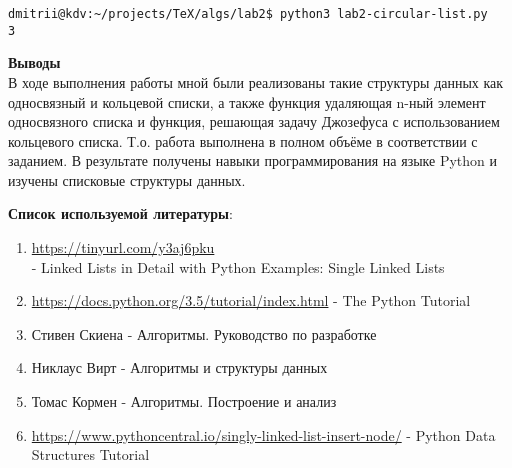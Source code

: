\documentclass[12pt]{article}
\begin{document}
\begin{verbatim}
dmitrii@kdv:~/projects/TeX/algs/lab2$ python3 lab2-circular-list.py 
3
\end{verbatim}
\textbf{Выводы}\\
В ходе выполнения работы мной были реализованы такие структуры данных как односвязный и кольцевой списки, а также функция удаляющая n-ный элемент односвязного списка и функция, решающая задачу Джозефуса с использованием кольцевого списка. Т.о. работа выполнена в полном объёме в соответствии с заданием. В результате получены навыки программирования на языке Python и изучены списковые структуры данных.
\par\bigskip
\textbf{Список используемой литературы}:
\begin{enumerate}
\item \url{https://tinyurl.com/y3aj6pku} \\ - Linked Lists in Detail with Python Examples: Single Linked Lists

\item \url{https://docs.python.org/3.5/tutorial/index.html} - The Python Tutorial
\item Стивен Скиена - Алгоритмы. Руководство по разработке
\item Никлаус Вирт - Алгоритмы и структуры данных
\item Томас Кормен - Алгоритмы. Построение и анализ
\item \url{https://www.pythoncentral.io/singly-linked-list-insert-node/} - Python Data Structures Tutorial
\end{enumerate}
\end{document}

